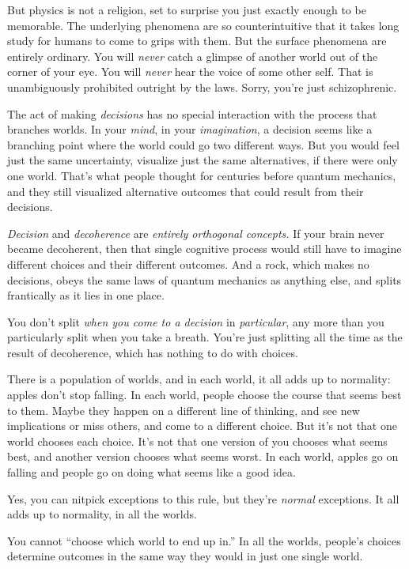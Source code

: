 {
 But physics is not a religion, set to surprise you just exactly
enough to be memorable. The underlying phenomena are so
counterintuitive that it takes long study for humans to come to grips
with them. But the surface phenomena are entirely ordinary. You will
\textit{never} catch a glimpse of another world out of the corner of
your eye. You will \textit{never} hear the voice of some other self.
That is unambiguously prohibited outright by the laws. Sorry,
you're just schizophrenic.}

{
 The act of making \textit{decisions} has no special interaction
with the process that branches worlds. In your \textit{mind}, in your
\textit{imagination}, a decision seems like a branching point where the
world could go two different ways. But you would feel just the same
uncertainty, visualize just the same alternatives, if there were only
one world. That's what people thought for centuries
before quantum mechanics, and they still visualized alternative
outcomes that could result from their decisions.}

{
 \textit{Decision} and \textit{decoherence} are \textit{entirely
orthogonal concepts.} If your brain never became decoherent, then that
single cognitive process would still have to imagine different choices
and their different outcomes. And a rock, which makes no decisions,
obeys the same laws of quantum mechanics as anything else, and splits
frantically as it lies in one place.}

{
 You don't split \textit{when you come to a
decision} in \textit{particular}, any more than you particularly split
when you take a breath. You're just splitting all the
time as the result of decoherence, which has nothing to do with
choices.}

{
 There is a population of worlds, and in each world, it all adds up
to normality: apples don't stop falling. In each world,
people choose the course that seems best to them. Maybe they happen on
a different line of thinking, and see new implications or miss others,
and come to a different choice. But it's not that one
world chooses each choice. It's not that one version of
you chooses what seems best, and another version chooses what seems
worst. In each world, apples go on falling and people go on doing what
seems like a good idea.}

{
 Yes, you can nitpick exceptions to this rule, but
they're \textit{normal} exceptions. It all adds up to
normality, in all the worlds.}

{
 You cannot ``choose which world to end up
in.'' In all the worlds, people's
choices determine outcomes in the same way they would in just one
single world.}

